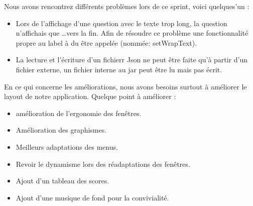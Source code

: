Nous avons rencontrez différents problèmes lors de ce sprint, voici quelques'un :
\begin{itemize}
	\item Lors de l'affichage d'une question avec le texte trop long, la question n'affichais que \ldots vers la fin. Afin de résoudre ce problème une fonctionnalité propre au label à du être appelée (nommée: setWrapText). 
	\item La lecture et l'écriture d'un fichierr Json ne peut être faite qu'à partir d'un fichier externe, un fichier interne au jar peut être lu mais pas écrit. 
\end{itemize}

En ce qui concerne les améliorations, nous avons besoins surtout à améliorer le layout de notre application. Quelque point à améliorer :
\begin{itemize}
	\item amélioration de l'ergonomie des fenêtres.
	\item Amélioration des graphismes.
	\item Meilleurs adaptations des menus.
	\item Revoir le dynamisme lors des réadaptations des fenêtres.
	\item Ajout d'un tableau des scores.
	\item Ajout d'une musique de fond pour la convivialité.
\end{itemize}
